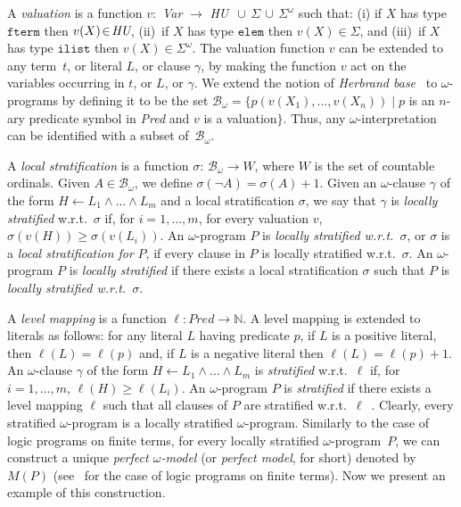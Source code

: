 \documentclass[english]{tlp}
\renewcommand{\mathit}{\displaystyle}
\begin{document}
A \emph{valuation} is a function $v\! :$ {\it{Var}} $\rightarrow $
\mbox{\it{HU}} $\, \cup\, \Sigma\, \cup\, \Sigma^{\omega}$ such
that: (i) if $X$ has type $\mathtt{fterm}$ then
$v(X)\!\in\!\mbox{\it{HU}}$, (ii)~if $X$ has type $\mathtt{elem}$
then $v(X)\!\in\!\Sigma$, and (iii)~if $X$ has type $\mathtt{ilist}$
then $v(X)\!\in\!\Sigma^{\omega}$. The valuation function $v$ can be
extended to any term~$t$, or literal $L$, or clause $\gamma$, by
making the function $v$ act on the variables occurring in $t$, or $L$, or
$\gamma$.
We extend the notion of {\em Herbrand base}~\cite{Llo87} to
$\omega$-programs by defining it to be the set $\mathcal{B}_{\omega}=
\{p(v(X_{1}),\ldots ,v(X_{n})) \mid p $ is an $n$-ary predicate 
symbol in {\it Pred} and $v$
is a valuation$\}$. Thus, any $\omega$-interpretation can be identified with a
subset of~\( \mathcal{B}_{\omega} \).

A \emph{local stratification} is a function \( \sigma  \): \(
\mathcal{B}_{\omega}\rightarrow W \), where \( W \) is the set of
countable ordinals. Given $A\in \mathcal{B}_{\omega}$, we define
$\sigma(\neg A) = \sigma(A)\!+\!1$. Given an $\omega$-clause $\gamma$ of the
form \( H\leftarrow L_{1}\wedge \ldots \wedge L_{m} \) 
and a local stratification \( \sigma \), we
say that \( \gamma \) is \emph{locally stratified} w.r.t.~\( \sigma
\) if, for \( i=1,\ldots ,m \), for every valuation $v$, \emph{\(
\sigma (v(H))\geq \sigma (v(L_i)) \)}. An $\omega$-program \( P \)
is \emph{locally stratified w.r.t.~}\( \sigma  \), or \( \sigma \)
is a \emph{local stratification for} \( P \), if every clause in \(
P \) is locally stratified w.r.t.~\( \sigma  \). An $\omega$-program
\( P \) is \emph{locally stratified} if there exists a local
stratification \( \sigma  \) such that \( P \) is \emph{locally
stratified w.r.t.~}\( \sigma  \). 

A \emph{level mapping} is a function $\ell:
\mathit{Pred}\rightarrow\mathbb{N}$. A level mapping is extended to
literals as follows: for any literal $L$ having predicate $p$, if
$L$ is a positive literal, then $\ell(L)=\ell(p)$ and, if $L$ is a
negative literal then $\ell(L)=\ell(p)+1$. An $\omega$-clause
$\gamma$ of the form \( H\leftarrow L_{1}\wedge \ldots \wedge L_{m}
\) is {\em stratified} w.r.t.~$\ell$ if, for \( i=1,\ldots ,m \),
\(\ell (H)\geq \ell(L_i)\). An $\omega$-program $P$ is
\emph{stratified} if there exists a level mapping $\ell$ such that
all clauses of $P$ are stratified w.r.t.~$\ell$~\cite{Llo87}. 
Clearly, every stratified
$\omega$-program is a locally stratified $\omega$-program.
Similarly to the case of logic programs on finite terms, for every locally
stratified $\omega$-program~$P$, we can construct a unique {\em perfect
$\omega$-model} (or {\em perfect model}, for short) denoted by
$M(P)$ (see~\cite{ApB94} for the case of logic programs on finite
terms). Now we present an example of this construction.
\end{document}
